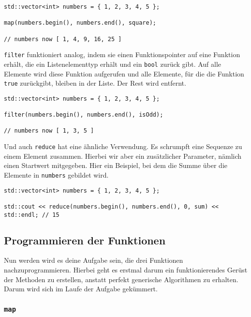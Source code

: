 \begin{lstlisting}
std::vector<int> numbers = { 1, 2, 3, 4, 5 };

map(numbers.begin(), numbers.end(), square);

// numbers now [ 1, 4, 9, 16, 25 ]
\end{lstlisting}

\lstinline{filter} funktioniert analog, indem sie einen Funktionspointer auf eine Funktion erhält, die ein Listenelementtyp erhält und ein \lstinline{bool} zurück gibt.
Auf alle Elemente wird diese Funktion aufgerufen und alle Elemente, für die die Funktion \lstinline{true} zurückgibt, bleiben in der Liste. Der Rest wird entfernt. \\

\begin{lstlisting}
std::vector<int> numbers = { 1, 2, 3, 4, 5 };

filter(numbers.begin(), numbers.end(), isOdd);

// numbers now [ 1, 3, 5 ]

\end{lstlisting}

Und auch \lstinline{reduce} hat eine ähnliche Verwendung.
Es schrumpft eine Sequenze zu einem Element zusammen.
Hierbei wir aber ein zusätzlicher Parameter, nämlich einen Startwert mitgegeben.
Hier ein Beispiel, bei dem die Summe über die Elemente in \lstinline{numbers} gebildet wird.

\begin{lstlisting}
std::vector<int> numbers = { 1, 2, 3, 4, 5 };

std::cout << reduce(numbers.begin(), numbers.end(), 0, sum) << std::endl; // 15

    \end{lstlisting}

\subsection{Programmieren der Funktionen}

Nun werden wird es deine Aufgabe sein, die drei Funktionen nachzuprogrammieren.
Hierbei geht es erstmal darum ein funktionierendes Gerüst der Methoden zu erstellen, anstatt perfekt generische Algorithmen zu erhalten.
Darum wird sich im Laufe der Aufgabe gekümmert.

\subsubsection{\lstinline{map}}

